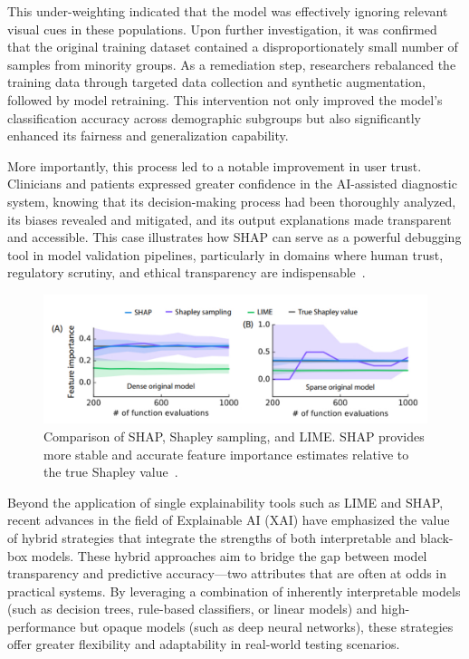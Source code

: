 \documentclass[manuscript,screen,review]{acmart}
\begin{document}
This under-weighting indicated that the model was effectively ignoring relevant visual cues in these populations. Upon further investigation, it was confirmed that the original training dataset contained a disproportionately small number of samples from minority groups. As a remediation step, researchers rebalanced the training data through targeted data collection and synthetic augmentation, followed by model retraining. This intervention not only improved the model’s classification accuracy across demographic subgroups but also significantly enhanced its fairness and generalization capability.

More importantly, this process led to a notable improvement in user trust. Clinicians and patients expressed greater confidence in the AI-assisted diagnostic system, knowing that its decision-making process had been thoroughly analyzed, its biases revealed and mitigated, and its output explanations made transparent and accessible. This case illustrates how SHAP can serve as a powerful debugging tool in model validation pipelines, particularly in domains where human trust, regulatory scrutiny, and ethical transparency are indispensable~\cite{Lundberg2017}.

\begin{figure}[htbp]
  \centering
  \includegraphics[width=0.85\linewidth]{picture/5.2fig2.pdf}
  \caption{Comparison of SHAP, Shapley sampling, and LIME. SHAP provides more stable and accurate feature importance estimates relative to the true Shapley value~\cite{Lundberg2017}.}
  \label{fig:shap}
\end{figure}

Beyond the application of single explainability tools such as LIME and SHAP, recent advances in the field of Explainable AI (XAI) have emphasized the value of hybrid strategies that integrate the strengths of both interpretable and black-box models. These hybrid approaches aim to bridge the gap between model transparency and predictive accuracy---two attributes that are often at odds in practical systems. By leveraging a combination of inherently interpretable models (such as decision trees, rule-based classifiers, or linear models) and high-performance but opaque models (such as deep neural networks), these strategies offer greater flexibility and adaptability in real-world testing scenarios.
\end{document}
